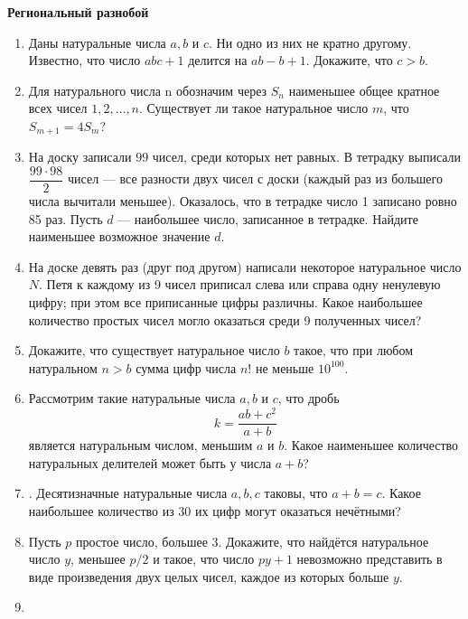 \documentclass{article}
\begin{document}
\large
	
\begin{center}
	\textbf{Региональный разнобой}
\end{center}


\begin{enumerate}[label*=\protect\fbox{\arabic{enumi}}]
	
\item Даны натуральные числа $a, b$ и $c$. Ни одно из них не кратно
другому. Известно, что число $abc + 1$ делится на $ab - b + 1$. Докажите, что $c > b$. 

\item Для натурального числа n обозначим через $S_n$ наименьшее общее кратное всех чисел $1, 2, \dotsc , n$. Существует ли такое натуральное число $m$, что $S_{m+1} = 4S_m$? 

\item  На доску записали $99$ чисел, среди которых нет равных. В тетрадку выписали $\dfrac{99 \cdot 98}{2}$
чисел — все разности двух чисел с доски (каждый раз из большего числа вычитали меньшее). Оказалось, что в тетрадке число 1 записано ровно 85 раз. Пусть $d$ — наибольшее число, записанное в тетрадке. Найдите наименьшее возможное значение $d$. 

\item На доске девять раз (друг под другом) написали некоторое натуральное число $N$. Петя к каждому из 9 чисел приписал слева или справа одну ненулевую цифру; при этом все приписанные цифры различны. Какое наибольшее количество простых чисел могло оказаться среди 9 полученных чисел?

\item Докажите, что существует натуральное число $b$ такое, что при любом натуральном $n > b$ сумма цифр числа $n!$ не меньше $10^{100}$.

\item Рассмотрим такие натуральные числа $a, b$ и $c$, что дробь $$k = \frac{ab+c^2}{a + b}$$ является натуральным числом, меньшим $a$ и $b$. Какое наименьшее количество натуральных делителей может быть у числа $a + b$? 

\item. Десятизначные натуральные числа $a, b, c$ таковы, что $a + b = c$. Какое наибольшее количество из 30 их цифр могут оказаться нечётными?

\item Пусть $p$ простое число, большее 3. Докажите, что найдётся натуральное число $y$, меньшее $p/2$ и такое, что число $py + 1$ невозможно представить в виде произведения двух целых чисел, каждое из которых больше $y$.

\item


\end{enumerate}
\end{document}
